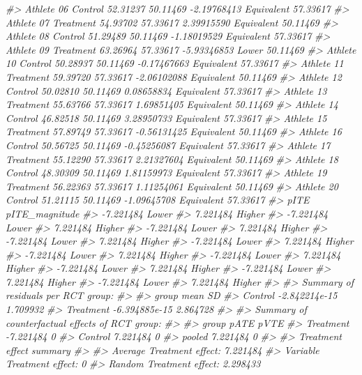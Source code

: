 \documentclass[
]{book}
\newenvironment{Shaded}{\begin{snugshade}}{\end{snugshade}}
\newcommand{\CommentTok}[1]{\textcolor[rgb]{0.56,0.35,0.01}{\textit{#1}}}
\begin{document}
\begin{Shaded}
\begin{Highlighting}[]
\CommentTok{\#>  Athlete 06   Control 52.31237  50.11469 {-}2.19768413 Equivalent       57.33617}
\CommentTok{\#>  Athlete 07 Treatment 54.93702  57.33617  2.39915590 Equivalent       50.11469}
\CommentTok{\#>  Athlete 08   Control 51.29489  50.11469 {-}1.18019529 Equivalent       57.33617}
\CommentTok{\#>  Athlete 09 Treatment 63.26964  57.33617 {-}5.93346853      Lower       50.11469}
\CommentTok{\#>  Athlete 10   Control 50.28937  50.11469 {-}0.17467663 Equivalent       57.33617}
\CommentTok{\#>  Athlete 11 Treatment 59.39720  57.33617 {-}2.06102088 Equivalent       50.11469}
\CommentTok{\#>  Athlete 12   Control 50.02810  50.11469  0.08658834 Equivalent       57.33617}
\CommentTok{\#>  Athlete 13 Treatment 55.63766  57.33617  1.69851405 Equivalent       50.11469}
\CommentTok{\#>  Athlete 14   Control 46.82518  50.11469  3.28950733 Equivalent       57.33617}
\CommentTok{\#>  Athlete 15 Treatment 57.89749  57.33617 {-}0.56131425 Equivalent       50.11469}
\CommentTok{\#>  Athlete 16   Control 50.56725  50.11469 {-}0.45256087 Equivalent       57.33617}
\CommentTok{\#>  Athlete 17 Treatment 55.12290  57.33617  2.21327604 Equivalent       50.11469}
\CommentTok{\#>  Athlete 18   Control 48.30309  50.11469  1.81159973 Equivalent       57.33617}
\CommentTok{\#>  Athlete 19 Treatment 56.22363  57.33617  1.11254061 Equivalent       50.11469}
\CommentTok{\#>  Athlete 20   Control 51.21115  50.11469 {-}1.09645708 Equivalent       57.33617}
\CommentTok{\#>       pITE pITE\_magnitude}
\CommentTok{\#>  {-}7.221484          Lower}
\CommentTok{\#>   7.221484         Higher}
\CommentTok{\#>  {-}7.221484          Lower}
\CommentTok{\#>   7.221484         Higher}
\CommentTok{\#>  {-}7.221484          Lower}
\CommentTok{\#>   7.221484         Higher}
\CommentTok{\#>  {-}7.221484          Lower}
\CommentTok{\#>   7.221484         Higher}
\CommentTok{\#>  {-}7.221484          Lower}
\CommentTok{\#>   7.221484         Higher}
\CommentTok{\#>  {-}7.221484          Lower}
\CommentTok{\#>   7.221484         Higher}
\CommentTok{\#>  {-}7.221484          Lower}
\CommentTok{\#>   7.221484         Higher}
\CommentTok{\#>  {-}7.221484          Lower}
\CommentTok{\#>   7.221484         Higher}
\CommentTok{\#>  {-}7.221484          Lower}
\CommentTok{\#>   7.221484         Higher}
\CommentTok{\#>  {-}7.221484          Lower}
\CommentTok{\#>   7.221484         Higher}
\CommentTok{\#> }
\CommentTok{\#> Summary of residuals per RCT group:}
\CommentTok{\#> }
\CommentTok{\#>      group          mean       SD}
\CommentTok{\#>    Control {-}2.842214e{-}15 1.709932}
\CommentTok{\#>  Treatment {-}6.394885e{-}15 2.864728}
\CommentTok{\#> }
\CommentTok{\#> Summary of counterfactual effects of RCT group:}
\CommentTok{\#> }
\CommentTok{\#>      group      pATE pVTE}
\CommentTok{\#>  Treatment {-}7.221484    0}
\CommentTok{\#>    Control  7.221484    0}
\CommentTok{\#>     pooled  7.221484    0}
\CommentTok{\#> }
\CommentTok{\#> Treatment effect summary}
\CommentTok{\#> }
\CommentTok{\#> Average Treatment effect:  7.221484}
\CommentTok{\#> Variable Treatment effect:  0}
\CommentTok{\#> Random Treatment effect:  2.298433}
\end{Highlighting}
\end{Shaded}
\end{document}
